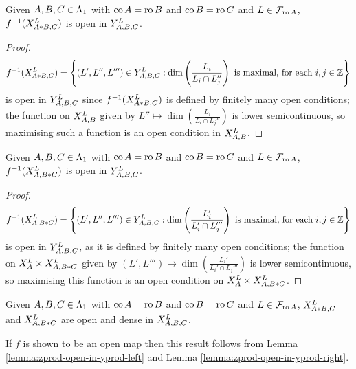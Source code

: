 \documentclass[a4paper, 11pt]{report}
\begin{document}
\begin{lemma}\label{lemma:zprod-open-in-yprod-left}
Given $A,B,C\in\matrices$ with $\co{A}=\ro{B}$ and $\co{B}=\ro{C}$ and $L\in\flags_{\ro{A}}$, $f^{-1}(\xprod[L]{A\ast B,C})$ is open in $\yprod[L]{A,B,C}$.
\end{lemma}

\begin{proof}
\begin{equation*}
f^{-1}(\xprod[L]{A\ast B,C}) = \left\{ (L',L'',L''')\in\yprod[L]{A,B,C}: \dim\left(\frac{L_i}{L_i\cap L_j''}\right) \text{ is maximal, for each }i,j\in\integers \right\}
\end{equation*}
is open in $\yprod[L]{A,B,C}$ since $f^{-1}(\xprod[L]{A\ast B,C})$ is defined by {\color{blue}finitely many} open conditions; the function on $\xprod[L]{A,B}$ given by $L''\mapsto \dim\left(\frac{L_i}{L_i\cap L_j''}\right)$ is lower semicontinuous, so maximising such a function is an open condition in $\xprod[L]{A,B}$.
\end{proof}

\begin{lemma}\label{lemma:zprod-open-in-yprod-right}
Given $A,B,C\in\matrices$ with $\co{A}=\ro{B}$ and $\co{B}=\ro{C}$ and $L\in\flags_{\ro{A}}$, $f^{-1}(\xprod[L]{A,B\ast C})$ is open in $\yprod[L]{A,B,C}$.
\end{lemma}

\begin{proof}
\begin{equation*}
f^{-1}(\xprod[L]{A,B\ast C}) = \left\{ (L',L'',L''')\in\yprod[L]{A,B,C}: \dim\left(\frac{L_i'}{L_i'\cap L_j'''}\right) \text{ is maximal, for each }i,j\in\integers \right\}
\end{equation*}
is open in $\yprod[L]{A,B,C}$, as it is defined by {\color{blue}finitely many} open conditions; the function on $\xprod[L]{A}\times\xprod[L]{A,B\ast C}$ given by $(L',L''')\mapsto\dim\left(\frac{L_i'}{L_i'\cap L_j'''}\right)$ is lower semicontinuous, so maximising this function is an open condition on $\xprod[L]{A}\times\xprod[L]{A,B\ast C}$.
\end{proof}

\begin{conjecture}\label{conjecture:open-embeddings-in-x}
Given $A,B,C\in\matrices$ with $\co{A}=\ro{B}$ and $\co{B}=\ro{C}$ and $L\in\flags_{\ro{A}}$, $\xprod[L]{A\ast B,C}$ and $\xprod[L]{A,B\ast C}$ are open and dense in $\xprod[L]{A,B,C}$.
\end{conjecture}

\begin{remark}
If $f$ is shown to be an open map then this result follows from Lemma \ref{lemma:zprod-open-in-yprod-left} and Lemma \ref{lemma:zprod-open-in-yprod-right}.
\end{remark}
\end{document}
